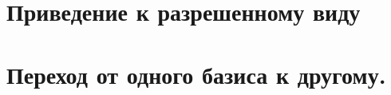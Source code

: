 \documentclass[unicode,11pt,notheorems]{beamer}
\newtheorem{theorem}{Теорема}
\begin{document}
\section{Приведение к разрешенному виду}



%
%

%


\section{Переход от одного базиса к другому.}
\end{document}
